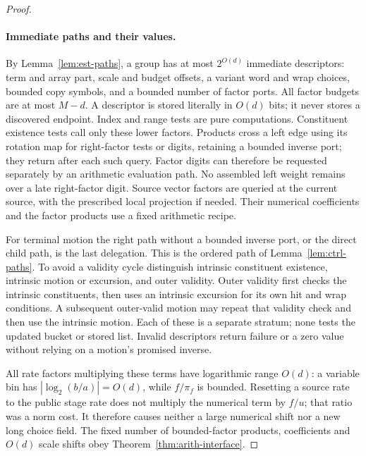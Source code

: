 \begin{proof}
\paragraph{Immediate paths and their values.}
By Lemma~\ref{lem:est-paths}, a group has at most $2^{O(d)}$ immediate
descriptors: term and array part, scale and budget offsets, a variant
word and wrap choices, bounded copy symbols, and a bounded number of
factor ports.  All factor budgets are at most $M-d$.  A descriptor is
stored literally in $O(d)$ bits; it never stores a discovered endpoint.
Index and range tests are pure computations.  Constituent existence
tests call only these lower factors.  Products cross a left edge using its rotation map for right-factor tests or digits, retaining a bounded inverse
port; they return after each such query.  Factor digits can therefore be
requested separately by an arithmetic evaluation path.  No assembled
left weight remains over a late right-factor digit.  Source vector
factors are queried at the current source, with the prescribed local
projection if needed.  Their numerical coefficients and the factor
products use a fixed arithmetic recipe.

For terminal motion the right path without a bounded inverse port, or the direct child
path, is the last delegation.  This is the ordered path of
Lemma~\ref{lem:ctrl-paths}.  To avoid a validity cycle distinguish
intrinsic constituent existence, intrinsic motion or excursion, and
outer validity.  Outer validity first checks the intrinsic constituents,
then uses an intrinsic excursion for its own hit and wrap conditions.
A subsequent outer-valid motion may repeat that validity check and
then use the intrinsic motion.  Each of these is a separate stratum;
none tests the updated bucket or stored list.  Invalid descriptors return
failure or a zero value without relying on a motion's promised inverse.

All rate factors multiplying these terms have logarithmic range
$O(d)$: a variable bin has $|\log_2(b/a)|=O(d)$, while $f/\pi_f$ is
bounded.  Resetting a source rate to the public stage rate does not
multiply the numerical term by $f/u$; that ratio was a norm cost.
It therefore causes neither a large numerical shift nor a new long
choice field.  The fixed number of bounded-factor products, coefficients
and $O(d)$ scale shifts obey Theorem~\ref{thm:arith-interface}.


\end{proof}
